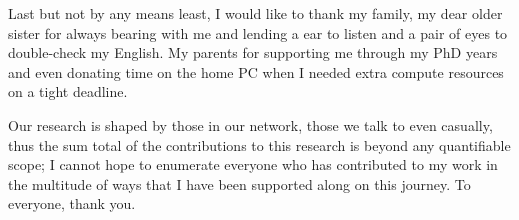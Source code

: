 Last but not by any means least, I would like to thank my family, my dear older
sister for always bearing with me and lending a ear to listen and a pair of eyes
to double-check my English. My parents for supporting me through my PhD years
and even donating time on the home PC when I needed extra compute resources on a
tight deadline.

Our research is shaped by those in our network, those we talk to even casually,
thus the sum total of the contributions to this research is beyond any
quantifiable scope; I cannot hope to enumerate everyone who has contributed to
my work in the multitude of ways that I have been supported along on this
journey. To everyone, thank you.
